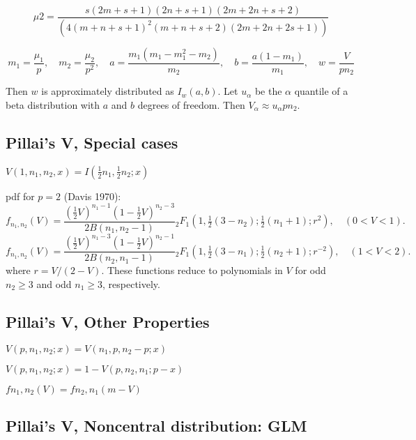 \begin{equation}
	\mu2=\frac{s(2m+s+1)(2n+s+1)(2m+2n+s+2)}{(4(m+n+s+1)^2(m+n+s+2)(2m+2n+2s+1))}
\end{equation}


\begin{equation}
	m_1= \frac{\mu_1}{p}, \quad  m_2= \frac{\mu_2}{p^2},  \quad  a= \frac{m_1 (m_1 - m_1^2 - m_2)}{m_2},  \quad  b = \frac{a(1-m_1)}{m_1} ,  \quad  w = \frac{V}{p n_2}
\end{equation}


Then $w$ is approximately distributed as $I_w(a,b)$. Let $u_{\alpha}$ be the $\alpha$ quantile of a beta distribution with $a$ and $b$ degrees of freedom. Then 
$V_{\alpha} \approx u_{\alpha} p n_2$.



\subsection{Pillai's V, Special cases}

$V(1,n_1,n_2,x) = I(\tfrac{1}{2}n_1,\tfrac{1}{2}n_2;x)$

\vpara
pdf for $p=2$ (Davis 1970):
\begin{equation}
	f_{n_1,n_2}(V) = \frac{( \tfrac{1}{2} V)^{n_1-1}(1-\tfrac{1}{2}V)^{n_2-3}}{2B(n_1,n_2-1)} {}_2F_1\left(1,\tfrac{1}{2}(3-n_2);\tfrac{1}{2}(n_1+1);r^2\right), \quad (0<V<1).
\end{equation}
\begin{equation}
	f_{n_1,n_2}(V) = \frac{( \tfrac{1}{2} V)^{n_1-3}(1-\tfrac{1}{2}V)^{n_2-1}}{2B(n_2,n_1-1)} {}_2F_1\left(1,\tfrac{1}{2}(3-n_1);\tfrac{1}{2}(n_2+1);r^{-2}\right), \quad (1<V<2).
\end{equation}
where $r=V/(2-V)$. These functions reduce to polynomials in $V$ for odd $n_2 \geq 3$ and odd $n_1 \geq 3$, respectively.


\subsection{Pillai's V, Other Properties}
$V(p,n_1,n_2;x) = V(n_1,p,n_2-p;x)$

$V(p,n_1,n_2;x) = 1-V(p,n_2,n_1;p-x)$

$fn_1,n_2(V) = fn_2,n_1(m-V)$




\subsection{Pillai's V, Noncentral distribution: GLM} 

